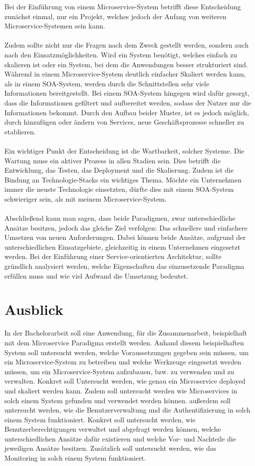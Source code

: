 Bei der Einführung von einem Microservice-System betrifft diese Entscheidung zunächst einmal, nur ein Projekt, welches jedoch der Anfang von weiteren Microservice-Systemen sein kann.
\\\\
Zudem sollte nicht nur die Fragen nach dem Zweck gestellt werden, sondern auch nach den Einsatzmöglichkeiten. Wird ein System benötigt, welches einfach zu skalieren ist oder ein System, bei dem die Anwendungen besser strukturiert sind. Während in einem Microservice-System deutlich einfacher Skaliert werden kann, als in einem SOA-System, werden durch die Schnittstellen sehr viele Informationen bereitgestellt. Bei einem SOA-System hingegen wird dafür gesorgt, dass die Informationen gefiltert und aufbereitet werden, sodass der Nutzer nur die Informationen bekommt. Durch den Aufbau beider Muster, ist es jedoch möglich, durch hinzufügen oder ändern von Services, neue Geschäftsprozesse schneller zu etablieren.
\\\\
Ein wichtiger Punkt der Entscheidung ist die Wartbarkeit, solcher Systeme. Die Wartung muss ein aktiver Prozess in allen Stadien sein. Dies betrifft die Entwicklung, das Testen, das Deployment und die Skalierung. Zudem ist die Bindung an Technologie-Stacks ein wichtiges Thema. Möchte ein Unternehmen immer die neuste Technologie einsetzten, dürfte dies mit einem SOA-System schwieriger sein, als mit meinem Microservice-System.
\\\\
Abschließend kann man sagen, dass beide Paradigmen, zwar unterschiedliche Ansätze besitzen, jedoch das gleiche Ziel verfolgen: Das schnellere und einfachere Umsetzen von neuen Anforderungen. Dabei können beide Ansätze, aufgrund der unterschiedlichen Einsatzgebiete, gleichzeitig in einem Unternehmen eingesetzt werden. Bei der Einführung einer Service-orientierten Architektur, sollte gründlich analysiert werden, welche Eigenschaften das einzusetzende Paradigma erfüllen muss und wie viel Aufwand die Umsetzung bedeutet.

\section{Ausblick}
\label{sec:Ausblick}
In der Bachelorarbeit soll eine Anwendung, für die Zusammenarbeit, beispielhaft mit dem Microservice Paradigma erstellt werden. Anhand diesem beispielhaften System soll untersucht werden, welche Voraussetzungen gegeben sein müssen, um ein Microservice-System zu betreiben und welche Werkzeuge eingesetzt werden müssen, um ein Microservice-System aufzubauen, bzw. zu verwenden und zu verwalten. Konkret soll Untersucht werden, wie genau ein Microservice deployed und skaliert werden kann. Zudem soll untersucht werden wie Microservices in solch einem System gefunden und verwendet werden können. außerdem soll untersucht werden, wie die Benutzerverwaltung und die Authentifizierung in solch einem System funktioniert. Konkret soll untersucht werden, wie Benutzerberechtigungen verwaltet und abgefragt werden können, welche unterschiedlichen Ansätze dafür existieren und welche Vor- und Nachteile die jeweiligen Ansätze besitzen. Zusätzlich soll untersucht werden, wie das Monitoring in solch einem System funktioniert.